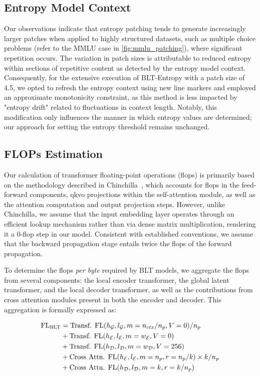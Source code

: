 \subsection{Entropy Model Context}
\label{section:entropy-context}
Our observations indicate that entropy patching tends to generate increasingly larger patches when applied to highly structured datasets, such as multiple choice problems (refer to the MMLU case in \autoref{fig:mmlu_patching}), where significant repetition occurs. The variation in patch sizes is attributable to reduced entropy within sections of repetitive content as detected by the entropy model context. Consequently, for the extensive execution of {\textsc BLT}-Entropy with a patch size of 4.5, we opted to refresh the entropy context using new line markers and employed an approximate monotonicity constraint, as this method is less impacted by "entropy drift" related to fluctuations in context length. Notably, this modification only influences the manner in which entropy values are determined; our approach for setting the entropy threshold remains unchanged.

\subsection{FLOPs Estimation} 
\label{section:flops}

Our calculation of transformer floating-point operations (flops) is primarily based on the methodology described in Chinchilla~\citep{hoffmann2022training}, which accounts for flops in the feed-forward components, qkvo projections within the self-attention module, as well as the attention computation and output projection steps. However, unlike Chinchilla, we assume that the input embedding layer operates through an efficient lookup mechanism rather than via dense matrix multiplication, rendering it a 0-flop step in our model. Consistent with established conventions, we assume that the backward propagation stage entails twice the flops of the forward propagation.

To determine the flops \textit{per byte} required by {\textsc BLT} models, we aggregate the flops from several components: the local encoder transformer, the global latent transformer, and the local decoder transformer, as well as the contributions from cross attention modules present in both the encoder and decoder. This aggregation is formally expressed as:

\begin{align}
    \text{FL}_{\text{{\textsc BLT}}} &= \text{Transf. FL}(h_{\mathcal{G}}, l_{\mathcal{G}}, m=n_{ctx}/n_p, V=0) / n_p\\
   &+\text{Transf. FL}(h_{\mathcal{E}}, l_{\mathcal{E}}, m=w_{\mathcal{E}}, V=0) \\
   &+ \text{Transf. FL}(h_{\mathcal{D}}, l_{\mathcal{D}}, m=w_{\mathcal{D}}, V=256) \\ 
    &+ \text{Cross Attn. FL}(h_{\mathcal{E}}, l_{\mathcal{E}}, m=n_p, r=n_p/k) \times k / n_p \\ 
   &+ \text{Cross Attn. FL}(h_{\mathcal{D}}, l_{\mathcal{D}}, m=k, r=k/n_p) 
\end{align}

